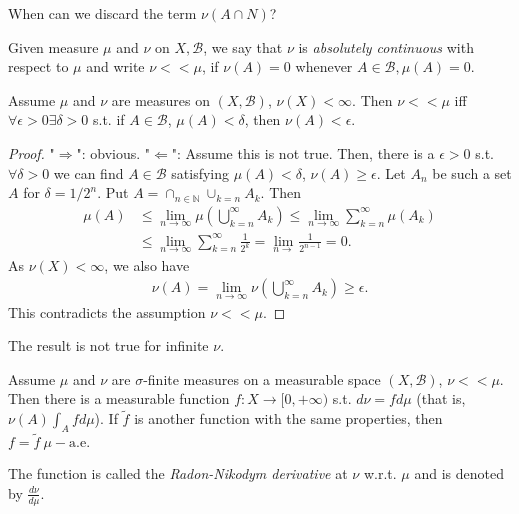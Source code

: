 When can we discard the term \(\nu(A\cap N)\)?
\begin{definition}
    Given measure \(\mu\) and \(\nu\) on \(X,\mathscr{B}\), we say that \(\nu\) is \emph{absolutely continuous} with respect to \(\mu\) and
    write \(\nu<<\mu\), if \(\nu(A)=0\) whenever \(A\in\mathscr{B}, \mu(A)=0\).
\end{definition}
\begin{lemma}
    Assume \(\mu\) and \(\nu\) are measures on \((X,\mathscr{B})\), \(\nu(X)<\infty\). Then \(\nu<<\mu\) iff 
    \(\forall \epsilon>0\exists\delta>0\) s.t. if \(A\in\mathscr{B}\), \(\mu(A)<\delta\), then \(\nu(A)<\epsilon\).
\end{lemma}
\begin{proof}
    "\(\Rightarrow\)": obvious. "\(\Leftarrow\)": Assume this is not true. Then, there is a \(\epsilon>0\) s.t. \(\forall \delta>0\) we can
    find \(A\in\mathscr{B}\) satisfying \(\mu(A)<\delta\), \(\nu(A)\geq\epsilon\). Let \(A_n\) be such a set \(A\) for \(\delta=1/2^n\). Put
    \(A=\cap_{n\in\mathbb{N}}\cup_{k=n}A_k\). Then
    \begin{align*}
        \mu(A) &\leq \lim\limits_{n\rightarrow\infty}\mu\left(\bigcup_{k=n}^{\infty}A_k\right) 
        \leq \lim\limits_{n\rightarrow\infty}\sum\limits_{k=n}^{\infty}\mu(A_k) \\ 
        &\leq \lim\limits_{n\rightarrow\infty}\sum\limits_{k=n}^{\infty}\frac{1}{2^k} = \lim\limits_{n\rightarrow} \frac{1}{2^{n-1}} = 0.
    \end{align*}
    As \(\nu(X)<\infty\), we also have 
    \begin{align*}
        \nu(A) = \lim\limits_{n\rightarrow\infty}\nu\left(\bigcup_{k=n}^{\infty}A_k\right) \geq \epsilon.
    \end{align*}
    This contradicts the assumption \(\nu <<\mu\).
\end{proof}
\begin{remark}
    The result is not true for infinite \(\nu\).
\end{remark}
\begin{theorem}
    Assume \(\mu\) and \(\nu\) are \(\sigma\)-finite measures on a measurable space \((X,\mathscr{B})\), \(\nu<<\mu\). Then there is a
    measurable function \(f:X\rightarrow [0,+\infty)\) s.t. \(d\nu=fd\mu\) (that is, \(\nu(A) \int_Afd\mu\)). If \(\tilde{f}\) is
    another function with the same properties, then \(f=\tilde{f}\ \mu-\text{a.e.}\)

    The function is called the \emph{Radon-Nikodym derivative} at \(\nu\) w.r.t. \(\mu\) and is denoted by \(\frac{d\nu}{d\mu}\).
\end{theorem}
